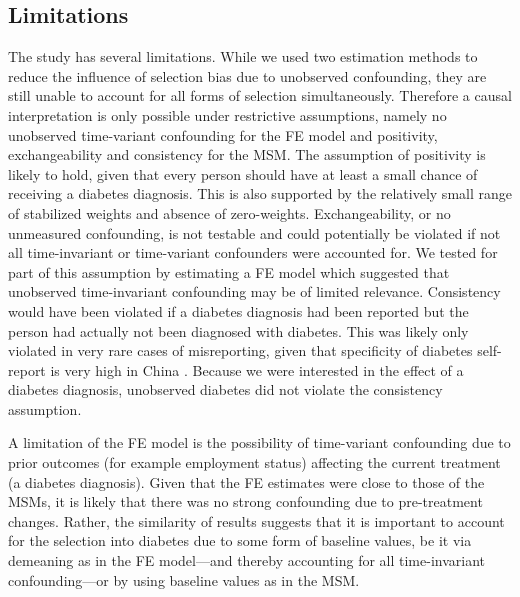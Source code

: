\subsection{Limitations}

The study has several limitations. While we used two estimation methods to reduce the influence of selection bias due to unobserved confounding, they are still unable to account for all forms of selection simultaneously. Therefore a causal interpretation is only possible under restrictive assumptions, namely no unobserved time-variant confounding for the \ac{FE} model and positivity, exchangeability and consistency for the \ac{MSM}. The assumption of positivity is likely to hold, given that every person should have at least a small chance of receiving a diabetes diagnosis. This is also supported by the relatively small range of stabilized weights and absence of zero-weights. Exchangeability, or no unmeasured confounding, is not testable and could potentially be violated if not all time-invariant or time-variant confounders were accounted for. We tested for part of this assumption by estimating a \ac{FE} model which suggested that unobserved time-invariant confounding may be of limited relevance. Consistency would have been violated if a diabetes diagnosis had been reported but the person had actually not been diagnosed with diabetes. This was likely only violated in very rare cases of misreporting, given that specificity of diabetes self-report is very high in China \autocite{Yuan2015}. Because we were interested in the effect of a diabetes diagnosis, unobserved diabetes did not violate the consistency assumption.

A limitation of the \ac{FE} model is the possibility of time-variant confounding due to prior outcomes (for example employment status) affecting the current treatment (a diabetes diagnosis). Given that the \ac{FE} estimates were close to those of the \acp{MSM}, it is likely that there was no strong confounding due to pre-treatment changes. Rather, the similarity of results suggests that it is important to account for the selection into diabetes due to some form of baseline values, be it via demeaning as in the \ac{FE} model---and thereby accounting for all time-invariant confounding---or by using baseline values as in the \ac{MSM}.

